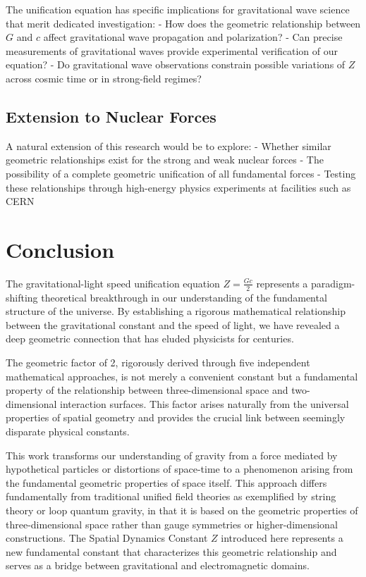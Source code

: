 \documentclass[nature,numbers]{article}
\begin{document}
The unification equation has specific implications for gravitational wave science that merit dedicated investigation:\cite{abbott2016observation}
- How does the geometric relationship between $G$ and $c$ affect gravitational wave propagation and polarization?
- Can precise measurements of gravitational waves provide experimental verification of our equation?
- Do gravitational wave observations constrain possible variations of $Z$ across cosmic time or in strong-field regimes?

\subsection{Extension to Nuclear Forces}

A natural extension of this research would be to explore:\cite{weinberg1972gravitation}
- Whether similar geometric relationships exist for the strong and weak nuclear forces
- The possibility of a complete geometric unification of all fundamental forces
- Testing these relationships through high-energy physics experiments at facilities such as CERN

\section{Conclusion}

The gravitational-light speed unification equation $Z = \frac{G c}{2}$ represents a paradigm-shifting theoretical breakthrough in our understanding of the fundamental structure of the universe. By establishing a rigorous mathematical relationship between the gravitational constant and the speed of light, we have revealed a deep geometric connection that has eluded physicists for centuries.

The geometric factor of 2, rigorously derived through five independent mathematical approaches, is not merely a convenient constant but a fundamental property of the relationship between three-dimensional space and two-dimensional interaction surfaces. This factor arises naturally from the universal properties of spatial geometry and provides the crucial link between seemingly disparate physical constants.

This work transforms our understanding of gravity from a force mediated by hypothetical particles or distortions of space-time to a phenomenon arising from the fundamental geometric properties of space itself. This approach differs fundamentally from traditional unified field theories as exemplified by string theory\cite{green2010string} or loop quantum gravity\cite{rovelli2004quantum}, in that it is based on the geometric properties of three-dimensional space rather than gauge symmetries or higher-dimensional constructions. The Spatial Dynamics Constant $Z$ introduced here represents a new fundamental constant that characterizes this geometric relationship and serves as a bridge between gravitational and electromagnetic domains.
\end{document}
